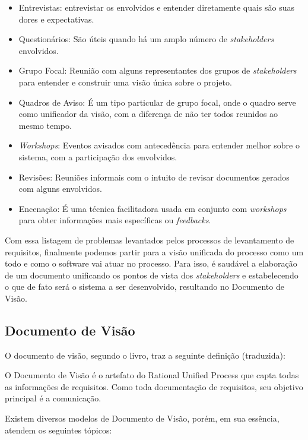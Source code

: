 \begin{itemize}
    \item Entrevistas: entrevistar os envolvidos e entender diretamente quais são suas dores e expectativas.
    \item Questionários: São úteis quando há um amplo número de \textit{stakeholders} envolvidos.
    \item Grupo Focal: Reunião com alguns representantes dos grupos de \textit{stakeholders} para entender e construir uma visão única sobre o projeto.
    \item Quadros de Aviso: É um tipo particular de grupo focal, onde o quadro serve como unificador da visão, com a diferença de não ter todos reunidos ao mesmo tempo.
    \item \textit{Workshops}: Eventos avisados com antecedência para entender melhor sobre o sistema, com a participação dos envolvidos.
    \item Revisões: Reuniões informais com o intuito de revisar documentos gerados com alguns envolvidos.
    \item Encenação: É uma técnica facilitadora usada em conjunto com \textit{workshops} para obter informações mais específicas ou \textit{feedbacks}.
\end{itemize}

Com essa listagem de problemas levantados pelos processos de levantamento de requisitos, finalmente podemos partir para a visão unificada do processo como um todo e como o software vai atuar no processo. Para isso, é saudável a elaboração de um documento unificando os pontos de vista dos \textit{stakeholders} e estabelecendo o que de fato será o sistema a ser desenvolvido, resultando no Documento de Visão.

\subsection{Documento de Visão}

O documento de visão, segundo o livro\cite{kurtbittnerianspence2002}, traz a seguinte definição (traduzida):

\begin{citacaoLonga}
O Documento de Visão é o artefato do Rational Unified Process\cite{ibm2011} que capta todas as informações de requisitos. Como toda documentação de requisitos, seu objetivo principal é a comunicação.
\end{citacaoLonga}

Existem diversos modelos de Documento de Visão, porém, em sua essência, atendem os seguintes tópicos\cite{kurtbittnerianspence2002}:

